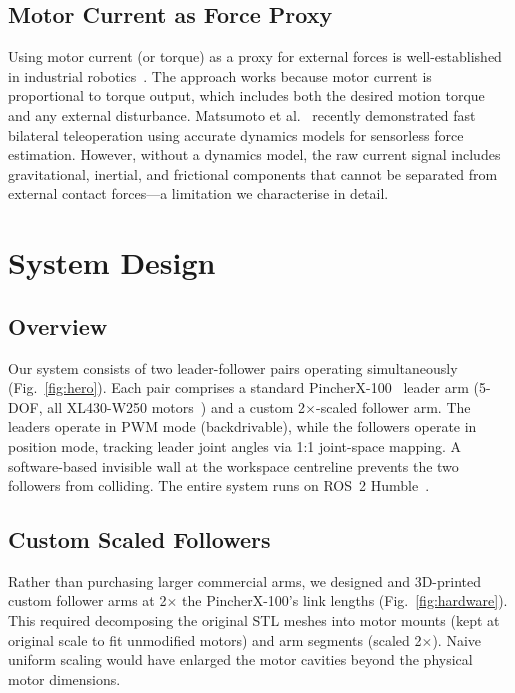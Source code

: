 \documentclass[conference]{IEEEtran}
\begin{document}
\subsection{Motor Current as Force Proxy}

Using motor current (or torque) as a proxy for external forces is well-established in industrial robotics~\cite{morante2016}. The approach works because motor current is proportional to torque output, which includes both the desired motion torque and any external disturbance. Matsumoto et al.~\cite{fast_bilateral2025} recently demonstrated fast bilateral teleoperation using accurate dynamics models for sensorless force estimation. However, without a dynamics model, the raw current signal includes gravitational, inertial, and frictional components that cannot be separated from external contact forces---a limitation we characterise in detail.

\section{System Design}

\subsection{Overview}

Our system consists of two leader-follower pairs operating simultaneously (Fig.~\ref{fig:hero}). Each pair comprises a standard PincherX-100~\cite{px100specs} leader arm (5-DOF, all XL430-W250 motors~\cite{xl430manual}) and a custom 2$\times$-scaled follower arm. The leaders operate in PWM mode (backdrivable), while the followers operate in position mode, tracking leader joint angles via 1:1 joint-space mapping. A software-based invisible wall at the workspace centreline prevents the two followers from colliding. The entire system runs on ROS~2 Humble~\cite{macenski_2022_robot}.

\subsection{Custom Scaled Followers}

Rather than purchasing larger commercial arms, we designed and 3D-printed custom follower arms at 2$\times$ the PincherX-100's link lengths (Fig.~\ref{fig:hardware}). This required decomposing the original STL meshes into motor mounts (kept at original scale to fit unmodified motors) and arm segments (scaled 2$\times$). Naive uniform scaling would have enlarged the motor cavities beyond the physical motor dimensions.
\end{document}

